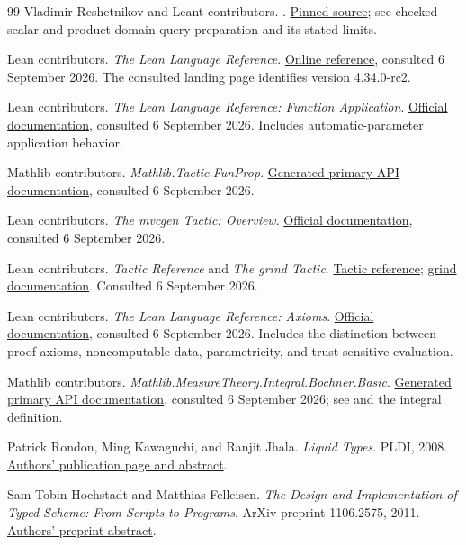 \documentclass[11pt,letterpaper]{article}
\newcommand{\code}[1]{\texttt{\detokenize{#1}}}
\theoremstyle{definition}\newtheorem{definition}[theorem]{Definition}
\theoremstyle{remark}\newtheorem{remark}[theorem]{Remark}
\begin{document}
\begin{thebibliography}{99}
Vladimir Reshetnikov and Leant contributors.
.
\href{https://github.com/VladimirReshetnikov/Leant/blob/3a40904be8a410d832d9ab6900b3d3e7b425eccb/src/Leant/Synth/Length/Adapter.hs}{Pinned source};
see checked scalar and product-domain query preparation and its stated limits.

Lean contributors. \emph{The Lean Language Reference}.
\href{https://lean-lang.org/doc/reference/latest/}{Online reference}, consulted
6 September 2026. The consulted landing page identifies version 4.34.0-rc2.

Lean contributors. \emph{The Lean Language Reference: Function Application}.
\href{https://lean-lang.org/doc/reference/latest/Terms/Function-Application/}{Official documentation},
consulted 6 September 2026. Includes automatic-parameter application behavior.

Mathlib contributors. \emph{Mathlib.Tactic.FunProp}.
\href{https://leanprover-community.github.io/mathlib4_docs/Mathlib/Tactic/FunProp.html}{Generated primary API documentation},
consulted 6 September 2026.

Lean contributors. \emph{The mvcgen Tactic: Overview}.
\href{https://lean-lang.org/doc/reference/latest/The--mvcgen--tactic/Overview/}{Official documentation},
consulted 6 September 2026.

Lean contributors. \emph{Tactic Reference} and \emph{The grind Tactic}.
\href{https://lean-lang.org/doc/reference/latest/Tactic-Proofs/Tactic-Reference/}{Tactic reference};
\href{https://lean-lang.org/doc/reference/latest/The--grind--tactic/}{grind documentation}.
Consulted 6 September 2026.

Lean contributors. \emph{The Lean Language Reference: Axioms}.
\href{https://lean-lang.org/doc/reference/latest/Axioms/}{Official documentation},
consulted 6 September 2026. Includes the distinction between proof axioms,
noncomputable data, parametricity, and trust-sensitive evaluation.

Mathlib contributors. \emph{Mathlib.MeasureTheory.Integral.Bochner.Basic}.
\href{https://leanprover-community.github.io/mathlib4_docs/Mathlib/MeasureTheory/Integral/Bochner/Basic.html}{Generated primary API documentation},
consulted 6 September 2026; see \code{integral_congr_ae} and the integral definition.

Patrick Rondon, Ming Kawaguchi, and Ranjit Jhala.
\emph{Liquid Types}. PLDI, 2008.
\href{https://goto.ucsd.edu/~rjhala/papers/liquid_types.html}{Authors' publication page and abstract}.

Sam Tobin-Hochstadt and Matthias Felleisen.
\emph{The Design and Implementation of Typed Scheme: From Scripts to Programs}.
ArXiv preprint 1106.2575, 2011.
\href{https://arxiv.org/abs/1106.2575}{Authors' preprint abstract}.

\end{thebibliography}
\end{document}
